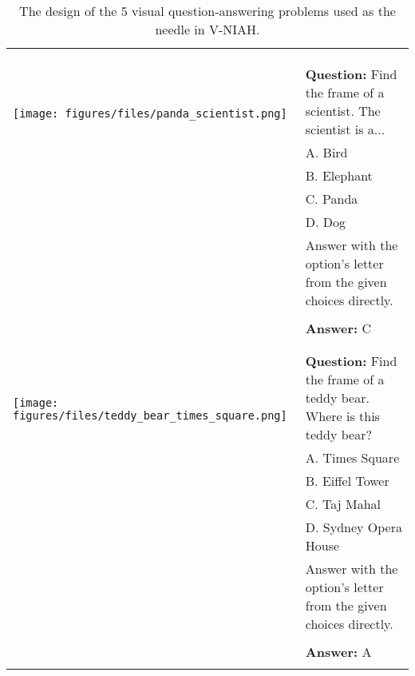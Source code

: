 \begin{table*}[h!]
\begin{center}
{{\begin{tabular}{p{4cm} p{10cm}}
      \\
      \\
      \\
      \midrule 
      \\
      \multirow{2}{*}{\texttt{[image: figures/files/panda\_scientist.png]}} & \textbf{Question:} Find the frame of a scientist. The scientist is a... \\
      & A. Bird \\
      & B. Elephant \\
      & C. Panda \\
      & D. Dog \\
      & Answer with the option's letter from the given choices directly. \\
      \\
      & \textbf{Answer:} C \\
      \\
      \midrule 
      \\
      \multirow{2}{*}{\texttt{[image: figures/files/teddy\_bear\_times\_square.png]}}  & \textbf{Question:} Find the frame of a teddy bear. Where is this teddy bear? \\
      & A. Times Square \\
      & B. Eiffel Tower \\
      & C. Taj Mahal \\
      & D. Sydney Opera House \\
      & Answer with the option's letter from the given choices directly. \\
      \\
      & \textbf{Answer:} A \\
      \\
      \midrule 
    \end{tabular}
  }
  }
  \end{center}
\caption{The design of the 5 visual question-answering problems used as the needle in V-NIAH.}
\label{tab:vniah-needles}
\end{table*}